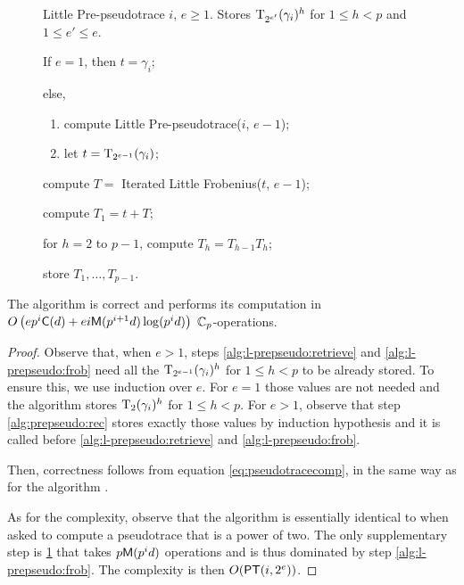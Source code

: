 \begin{figure}[h]
  \begin{algorithm}
    {Little Pre-pseudotrace}
    {$i$, $e\ge1$.}
    {Stores $\operatorname{T}_{2^{e'}}(\gamma_i)^h$ for $1\le h < p$ and $1\le e'\le e$.}
  \item \label{alg:l-prepseudo:base}If $e = 1$, then $t = \gamma_i$;
  \item \label{alg:l-prepseudo:even}else, 
    \begin{enumerate}
    \item \label{alg:l-prepseudo:rec}compute Little
      Pre-pseudotrace($i$, $e-1$);
    \item \label{alg:l-prepseudo:retrieve}let $t =
      \operatorname{T}_{2^{e-1}}(\gamma_i)$;
    \end{enumerate}
  \item \label{alg:l-prepseudo:frob} compute $T = $ Iterated Little
    Frobenius($t$, $e-1$);
  \item \label{alg:l-prepseudo:sum} compute $T_1 = t + T$;
  \item \label{alg:l-prepseudo:for}for $h = 2$ to $p-1$, compute $T_h =
    T_{h-1}T_h$;
  \item store $T_1,\ldots,T_{p-1}$.
  \end{algorithm}
\end{figure}

\sloppy
\begin{theorem}
  The algorithm  is correct and performs
  its computation in $O\left(ep^i\mathrm{\sf C}(d) +
  ei\mathrm{\sf M}(p^{i+1}d)\log(p^id)\right)$ $\mathbb{C}_p$-operations.
\end{theorem}
\fussy
\begin{proof}
  Observe that, when $e>1$, steps \ref{alg:l-prepseudo:retrieve} and
  \ref{alg:l-prepseudo:frob} need all the $\operatorname{T}_{2^{e-1}}(\gamma_i)^h$
  for $1\le h<p$ to be already stored. To ensure this, we use
  induction over $e$. For $e=1$ those values are not needed and the
  algorithm stores $\operatorname{T}_{2}(\gamma_i)^h$ for $1\le h<p$. For $e>1$,
  observe that step \ref{alg:prepseudo:rec} stores exactly those
  values by induction hypothesis and it is called before
  \ref{alg:l-prepseudo:retrieve} and \ref{alg:l-prepseudo:frob}.
  
  Then, correctness follows from equation \eqref{eq:pseudotracecomp},
  in the same way as for the algorithm .

  As for the complexity, observe that the algorithm is essentially
  identical to  when asked to compute a
  pseudotrace that is a power of two. The only supplementary step is
  \ref{alg:l-prepseudo:for} that takes $p\mathrm{\sf M}(p^id)$ operations and
  is thus dominated by step \ref{alg:l-prepseudo:frob}. The complexity
  is then $O(\mathrm{\sf PT}(i,2^e))$.
\end{proof}

